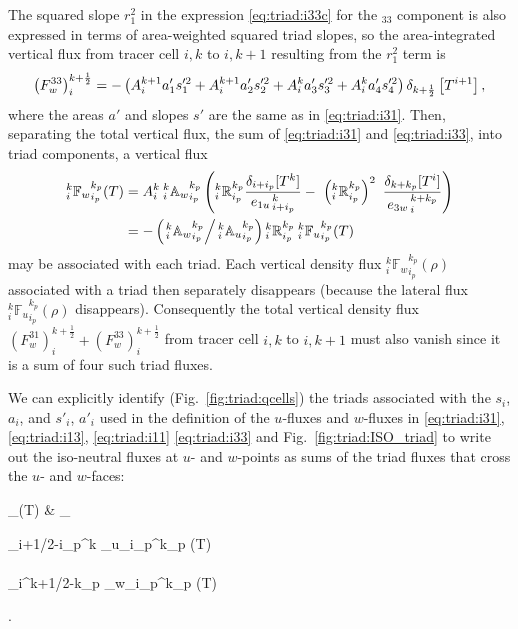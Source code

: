 \documentclass[NEMO_book]{subfiles}
\begin{document}
The squared slope $r_1^2$ in the expression \eqref{eq:triad:i33c} for the
$_{33}$ component is also expressed in terms of area-weighted
squared triad slopes, so the area-integrated vertical flux from tracer
cell $i,k$ to $i,k+1$ resulting from the $r_1^2$ term is
\begin{equation}
  \label{eq:triad:i33}
  \left( F_w^{33} \right) _i^{k+\frac{1}{2}} =
    - \left( {A}_i^{k+1} a_{1}' s_{1}'^2
    + {A}_i^{k+1} a_{2}' s_{2}'^2
    + {A}_i^k a_{3}' s_{3}'^2
    + {A}_i^k a_{4}' s_{4}'^2 \right)\delta_{k+\frac{1}{2}} \left[ T^{i+1} \right],
\end{equation}
where the areas $a'$ and slopes $s'$ are the same as in
\eqref{eq:triad:i31}.
Then, separating the total vertical flux, the sum of \eqref{eq:triad:i31} and
\eqref{eq:triad:i33}, into triad components,  a vertical flux
\begin{align}
  \label{eq:triad:vertflux-triad}
  _i^k {\mathbb{F}_w}_{i_p}^{k_p} (T)
  &= {A}_i^k{\: }_i^k{\mathbb{A}_w}_{i_p}^{k_p}
  \left(
    {_i^k\mathbb{R}_{i_p}^{k_p}}\frac{ \delta_{i+ i_p}[T^k] }{ {e_{1u}}_{\,i + i_p}^{\,k} }
    -\ \left({_i^k\mathbb{R}_{i_p}^{k_p}}\right)^2 \
    \frac{ \delta_{k+k_p} [T^i] }{{e_{3w}}_{\,i}^{\,k+k_p} }
  \right) \\
  &= - \left(\left.{ }_i^k{\mathbb{A}_w}_{i_p}^{k_p}\right/{ }_i^k{\mathbb{A}_u}_{i_p}^{k_p}\right)
   {_i^k\mathbb{R}_{i_p}^{k_p}}{\: }_i^k{\mathbb{F}_u}_{i_p}^{k_p} (T) \label{eq:triad:vertflux-triad2}
\end{align}
may be associated with each triad. Each vertical density flux $_i^k {\mathbb{F}_w}_{i_p}^{k_p} (\rho)$
associated with a triad then separately disappears (because the
lateral flux $_i^k{\mathbb{F}_u}_{i_p}^{k_p} (\rho)$
disappears). Consequently the total vertical density flux $\left( F_w^{31} \right)_i ^{k+\frac{1}{2}} +
\left( F_w^{33} \right)_i^{k+\frac{1}{2}}$ from tracer cell $i,k$
to $i,k+1$ must also vanish since it is a sum of four such triad
fluxes.

We can explicitly identify (Fig.~\ref{fig:triad:qcells}) the triads associated with the $s_i$, $a_i$, and $s'_i$, $a'_i$ used in the definition of
the $u$-fluxes and $w$-fluxes in
\eqref{eq:triad:i31}, \eqref{eq:triad:i13}, \eqref{eq:triad:i11} \eqref{eq:triad:i33} and
Fig.~\ref{fig:triad:ISO_triad} to  write out the iso-neutral fluxes at $u$- and
$w$-points as sums of the triad fluxes that cross the $u$- and $w$-faces:
\begin{flalign} \label{Eq_iso_flux} _(T) &\equiv
  \sum_{\substack{i_p,\,k_p}}
  \begin{pmatrix}
    {_{i+1/2-i_p}^k {_u}_{i_p}^{k_p} } (T)      \\
    \\
    {_i^{k+1/2-k_p} {_w}_{i_p}^{k_p} } (T)      \\
  \end{pmatrix}.
\end{flalign}
\end{document}
